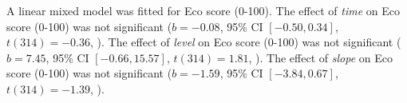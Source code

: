 A linear mixed model was fitted for Eco score (0-100).
The effect of \textit{time} on Eco score (0-100) was not significant ($b = -0.08$, 95\% CI $[-0.50, 0.34]$, $t(314) = -0.36$, ).
The effect of \textit{level} on Eco score (0-100) was not significant ($b = 7.45$, 95\% CI $[-0.66, 15.57]$, $t(314) = 1.81$, ).
The effect of \textit{slope} on Eco score (0-100) was not significant ($b = -1.59$, 95\% CI $[-3.84, 0.67]$, $t(314) = -1.39$, ).
